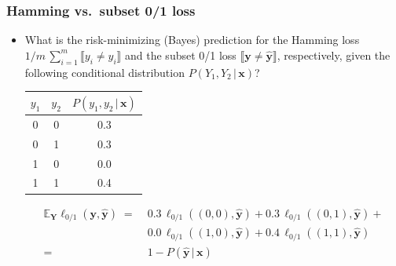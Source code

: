 \documentclass[]{beamer}
\renewcommand{\Pr}{P}
\renewcommand{\vec}[1]{\boldsymbol{#1}}
\newcommand{\by}{\boldsymbol{y}}
\newcommand{\assert}[1]{\llbracket #1 \rrbracket}
\renewcommand{\emph}[1]{\textbf{\color{putblue}#1}}
\begin{document}
\begin{frame}
\frametitle{Hamming vs.\ subset 0/1 loss}
\begin{itemize}
\item What is the risk-minimizing (Bayes) prediction for the Hamming loss $1/m  \, \sum_{i=1}^m \assert{y_i \neq  y_i}$ and the subset 0/1 loss $\assert{\by \ne \hat{\by}}$, respectively, given the following conditional distribution $\Pr(Y_1,Y_2 \, \vert \, \vec{x})$?

\medskip

\begin{center}
\begin{tabular}{ccc}
\toprule
$y_1$ & $y_2$ & $\Pr(y_1,y_2 \, | \, \vec{x})$  \\
\midrule
0   & 0   & 0.3    \\
0   & 1   & 0.3        \\
1   & 0   & 0.0       \\
1   & 1   & 0.4     \\
\bottomrule
\end{tabular}
\end{center}

\pause 

\small
\begin{align*}
\mathbb{E}_{\mathbf{Y}} \ell_{0/1}(\by, \hat{\by}) \; = \; & 0.3 \, \ell_{0/1}((0,0),\hat{\by}) +  
0.3 \, \ell_{0/1}((0,1),\hat{\by}) + \\
& 0.0 \, \ell_{0/1}((1,0),\hat{\by}) +  0.4 \, \ell_{0/1}((1,1),\hat{\by}) \\
= \; &  1 - \Pr(\hat{\by} \, | \, \vec{x}) 
\end{align*}



\end{itemize}
\end{frame}
\end{document}
